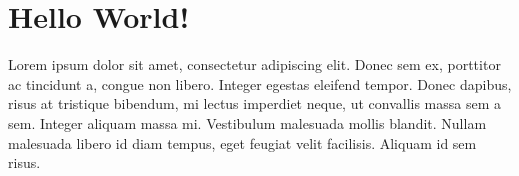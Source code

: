 \documentclass{article}
\begin{document}
\section{Hello World!}

Lorem ipsum dolor sit amet, consectetur adipiscing elit. Donec sem ex, porttitor ac tincidunt a, congue non libero. Integer egestas eleifend tempor. Donec dapibus, risus at tristique bibendum, mi lectus imperdiet neque, ut convallis massa sem a sem. Integer aliquam massa mi. Vestibulum malesuada mollis blandit. Nullam malesuada libero id diam tempus, eget feugiat velit facilisis. Aliquam id sem risus.
\end{document}
